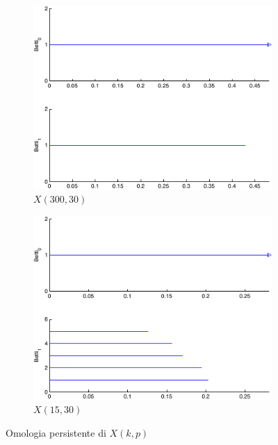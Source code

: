 \begin{figure}[ht]
  \begin{center}
    \begin{subfigure}[b]{.4\textwidth}
      \includegraphics[width=\textwidth]{gfx/image_patches_k300.pdf}
      \caption{$X(300,30)$}\label{fig:k300persistence}
    \end{subfigure}
    \begin{subfigure}[b]{.4\textwidth}
      \includegraphics[width=\textwidth]{gfx/image_patches_k15.pdf}
      \caption{$X(15,30)$}\label{fig:k15persistence}
    \end{subfigure}
    \caption{Omologia persistente di $X(k,p)$}
  \end{center}
\end{figure}

